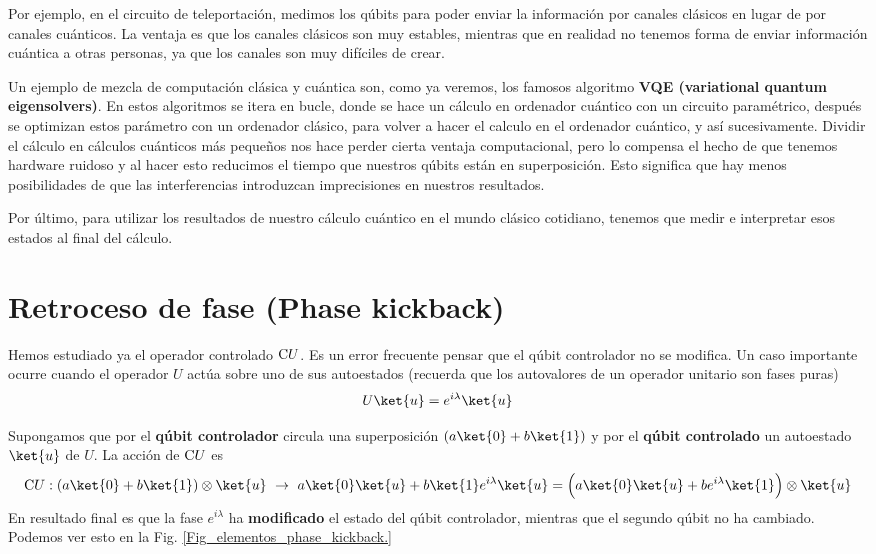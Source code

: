 \documentclass[a4paper,11pt]{book} %
\numberwithin{equation}{chapter}
\newcommand{\cg}[1]{{\rm C}#1}
\begin{document}
Por ejemplo, en el circuito de teleportación, medimos los qúbits para poder enviar la información por canales clásicos en lugar de por canales cuánticos. La ventaja es que los canales clásicos son muy estables, mientras que en realidad no tenemos forma de enviar información cuántica a otras personas, ya que los canales son muy difíciles de crear.

Un ejemplo de mezcla de computación clásica y cuántica son, como ya veremos, los famosos algoritmo \textbf{VQE (variational quantum eigensolvers)}. En estos algoritmos se itera en bucle, donde se hace un cálculo en ordenador cuántico con un circuito paramétrico, después se optimizan estos parámetro con un ordenador clásico, para volver a hacer el calculo en el ordenador cuántico, y así sucesivamente.  Dividir el cálculo en cálculos cuánticos más pequeños nos hace perder cierta ventaja computacional, pero lo compensa el hecho de que tenemos hardware ruidoso y al hacer esto reducimos el tiempo que nuestros qúbits están en superposición. Esto significa que hay menos posibilidades de que las interferencias introduzcan imprecisiones en nuestros resultados.

Por último, para utilizar los resultados de nuestro cálculo cuántico en el mundo clásico cotidiano, tenemos que medir e interpretar esos estados al final del cálculo.




    \section{Retroceso de fase (Phase kickback)}

Hemos estudiado ya el operador controlado $\cg{U}$. Es un error frecuente pensar que el qúbit controlador no se modifica. Un caso importante ocurre cuando el operador $U$ actúa sobre uno de sus autoestados (recuerda que los autovalores de  un operador unitario son fases puras)
	\begin{equation} \label{ec_elementos_U_sobre_eigen}
	U\ket{u} = e^{i\lambda} \ket{u}
	\end{equation}

Supongamos que por el \textbf{qúbit controlador} circula una superposición $(a\ket{0}+b\ket{1})$ y por el \textbf{qúbit controlado} un autoestado $\ket{u}$ de $U$.  La acción de $\cg{U}$ es
\begin{equation}
\cg{U}: (a\ket{0} + b\ket{1})\otimes \ket{u} ~\to ~ a\ket{0}\ket{u} + b \ket{1}e^{i\lambda}\ket{u}  = \left( a\ket{0}\ket{u} + be^{i\lambda} \ket{1} \rule{0mm}{4mm} \right)\otimes \ket{u}
\end{equation}
En resultado final es que la fase $e^{i\lambda}$ ha \textbf{modificado} el estado del qúbit controlador, mientras que el segundo qúbit no ha cambiado. Podemos ver esto en la Fig. \ref{Fig_elementos_phase_kickback.}
\end{document}
